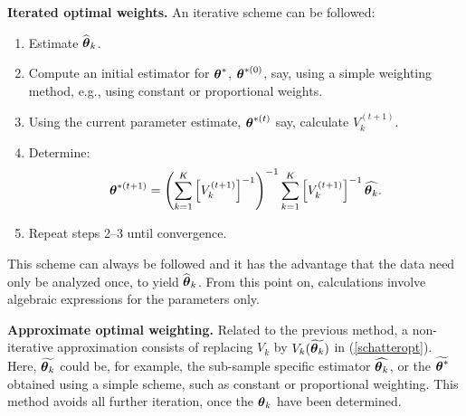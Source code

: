 \documentclass[11pt,a5paper,twoside]{book}
\newcommand{\bftheta}{\mbox{\boldmath $\theta$}}
\begin{document}
{\bfseries Iterated optimal weights.} An iterative 
scheme can be followed:
\begin{enumerate}
\item Estimate $\widehat{\bftheta}_k$.
\item Compute an initial estimator for $\bftheta^\ast$, $\bftheta^{\ast(0)}$, say, using a simple weighting method, e.g., using constant or proportional weights.
\item Using the current parameter estimate, $\bftheta^{\ast(t)}$ say, calculate $V_{k}^{(t+1)}$.
\item Determine:
$$
{\bftheta}^{\ast(t+1)}=
\left(
\sum_{k=1}^K\left[V_{k}^{(t+1)}\right]^{-1}
\right)^{-1}
\sum_{k=1}^K\left[V_{k}^{(t+1)}\right]^{-1}\widehat{\bftheta_k}
.
$$
\item Repeat steps 2--3 until convergence.
\end{enumerate}
This scheme can always be followed and it has the advantage that the data 
need only be analyzed once, to yield $\widehat{\bftheta}_k$. From this point on, 
calculations involve algebraic expressions for the parameters only.

{\bfseries Approximate optimal weighting.} Related to the previous 
method, a non-iterative approximation consists of replacing 
$V_k$ by $V_k(\widetilde{\bftheta_k})$ in (\ref{schatteropt}). 
Here, $\widetilde{\bftheta_k}$ could be, for example,  the 
sub-sample specific estimator $\widehat{\bftheta_k}$, or the  
$\widetilde{\bftheta^\ast}$ obtained using a simple scheme, 
such as constant or proportional weighting. This method avoids 
all further iteration, once the $\bftheta_k$ have been determined.
\end{document}
